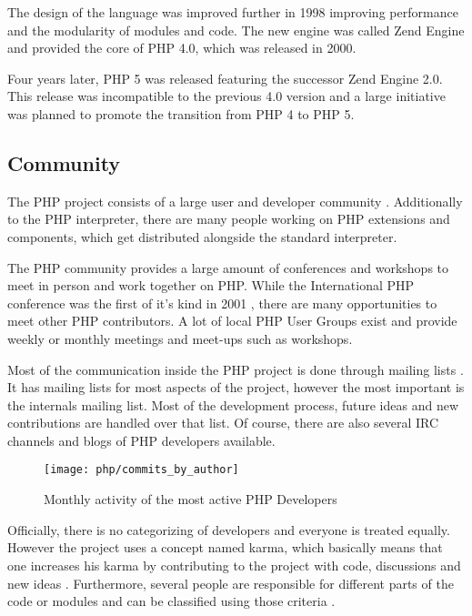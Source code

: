 The design of the language was improved further in 1998 improving performance
and the modularity of modules and code. The new engine was called Zend Engine
and provided the core of PHP 4.0, which was released in 2000.

Four years later, PHP 5 was released featuring the successor Zend Engine 2.0.
This release was incompatible to the previous 4.0 version and a large
initiative was planned to promote the transition from PHP 4 to PHP 5.


\subsection{Community} %

The PHP project consists of a large user and developer community
\cite{Magnusson2010}. Additionally to the PHP interpreter, there are many
people working on PHP extensions and components, which get distributed
alongside the standard interpreter.

The PHP community provides a large amount of conferences and workshops to meet
in person and work together on PHP. While the International PHP conference was
the first of it's kind in 2001 \cite{PHPConferences}, there are many
opportunities to meet other PHP contributors. A lot of local PHP User Groups
exist and provide weekly or monthly meetings and meet-ups such as workshops.

Most of the communication inside the PHP project is done through mailing lists
\cite{Magnusson2010}. It has mailing lists for most aspects of the project,
however the most important is the internals mailing list. Most of the
development process, future ideas and new contributions are handled over that
list. Of course, there are also several \ac{IRC} channels and blogs of PHP
developers available.

\begin{figure}[htbp]
  \centering
  \texttt{[image: php/commits\_by\_author]}
  \caption{Monthly activity of the most active PHP Developers}
\end{figure}

Officially, there is no categorizing of developers and everyone is treated
equally. However the project uses a concept named karma, which basically means
that one increases his karma by contributing to the project with code,
discussions and new ideas \cite{Magnusson2010}. Furthermore, several people are
responsible for different parts of the code or modules and can be classified
using those criteria \cite{PHPCredits}.

